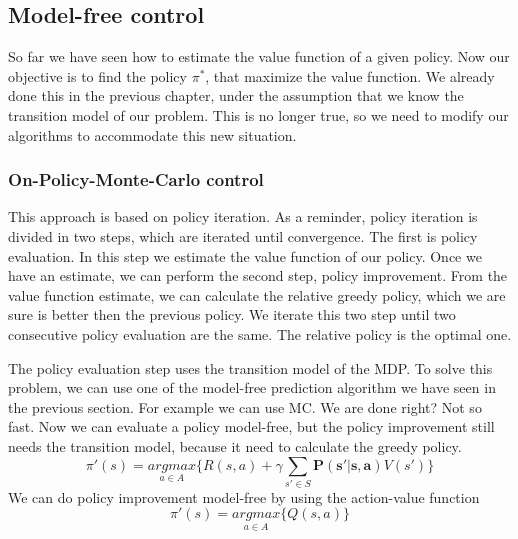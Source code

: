 \documentclass[main.tex]{subfiles}
\begin{document}
\subsection{Model-free control}
So far we have seen how to estimate the value function of a given policy. Now our objective is to find the policy $\pi^*$, that maximize the value function. We already done this in the previous chapter, under the assumption that we know the transition model of our problem. This is no longer true, so we need to modify our algorithms to accommodate this new situation.

\subsubsection{On-Policy-Monte-Carlo control}
This approach is based on policy iteration. As a reminder, policy iteration is divided in two steps, which are iterated until convergence. The first is policy evaluation. In this step we estimate the value function of our policy. Once we have an estimate, we can perform the second step, policy improvement. From the value function estimate, we can calculate the relative greedy policy, which we are sure is better then the previous policy. We iterate this two step until two consecutive policy evaluation are the same. The relative policy is the optimal one.
\par
\noindent
The policy evaluation step uses the transition model of the MDP. To solve this problem, we can use one of the model-free prediction algorithm we have seen in the previous section. For example we can use MC. We are done right? Not so fast. Now we can evaluate a policy model-free, but the policy improvement still needs the transition model, because it need to calculate the greedy policy.
\begin{equation*}
    \pi'(s) = \underset{a \in A}{argmax} \bigg\{ R(s,a) + \gamma \sum_{s' \in S} \mathbf{P(s'|s,a)} V(s') \bigg\}
\end{equation*}
We can do policy improvement model-free by using the action-value function
\begin{equation}
    \pi'(s) = \underset{a \in A}{argmax} \bigg\{ Q(s,a) \bigg\}
\end{equation}
\end{document}

